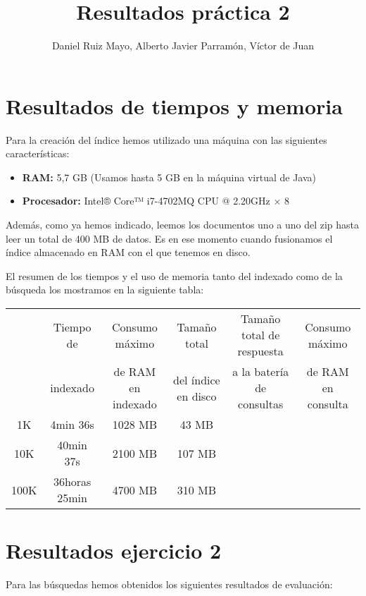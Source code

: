 \documentclass[palatino,nochap]{apuntes}
\title{Resultados práctica 2}
\author{Daniel Ruiz Mayo, Alberto Javier Parramón, Víctor de Juan}
\date{}
\begin{document}
\pagestyle{plain}
\maketitle



\section{Resultados de tiempos y memoria}
Para la creación del índice hemos utilizado una máquina con las siguientes características:

\begin{itemize}
	\item \textbf{RAM: }5,7 GB (Usamos hasta 5 GB en la máquina virtual de Java)
	\item \textbf{Procesador: } Intel® Core™ i7-4702MQ CPU @ 2.20GHz × 8 
\end{itemize}

Además, como ya hemos indicado, leemos los documentos uno a uno del zip hasta leer un total de 400 MB de datos. Es en ese momento cuando fusionamos el índice almacenado en RAM con el que tenemos en disco.

El resumen de los tiempos y el uso de memoria tanto del indexado como de la búsqueda los mostramos en la siguiente tabla:

\small{
\begin{changemargin}{-2cm}{0cm}
\begin{tabular}{|c|c|c|c|c|c|}
	\hline
	 & Tiempo de & Consumo máximo & Tamaño total & Tamaño total de respuesta & Consumo máximo  \\
	 & indexado & de RAM en indexado & del índice en disco & a la batería de consultas & de RAM en consulta \\
	\hline
	1K & 4min 36s & 1028 MB  & 43 MB & & \\
	\hline
	10K & 40min 37s & 2100 MB & 107 MB & & \\
	\hline
	100K & 36horas 25min &  4700 MB  & 310 MB & & \\
	\hline
\end{tabular}
\end{changemargin}
}

\newpage
\section{Resultados ejercicio 2}
Para las búsquedas hemos obtenidos los siguientes resultados de evaluación:
\end{document}
